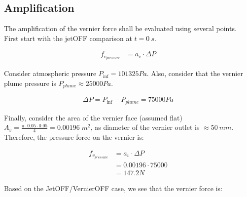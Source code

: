 \documentclass[12pt]{article}
\begin{document}
\subsection{Amplification}\label{sec:amplification}

The amplification of the vernier force shall be evaluated using several points. First start with the jetOFF comparison at $t=0~s$. 

\begin{align}
    f_{v_{pressure}} &= a_v \cdot \Delta P
\end{align}

Consider atmospheric pressure $P_{\inf}=101325Pa$. Also, consider that the vernier plume pressure is $P_{plume}\approx 25000Pa$.

\begin{align}
    \Delta P = P_{\inf}-P_{plume}= 75000Pa
\end{align}

Finally, consider the area of the vernier face (assumed flat) $A_v = \frac{\pi\cdot0.05\cdot0.05}{4} = 0.00196\;m^2$, as diameter of the vernier outlet is $\approx 50~mm$. Therefore, the pressure force on the vernier is:

\begin{align}
    f_{v_{pressure}} &= a_v \cdot \Delta P\\
     &= 0.00196 \cdot 75000\\
     &=147.2N
\end{align}

Based on the JetOFF/VernierOFF case, we see that the vernier force is:
\end{document}
